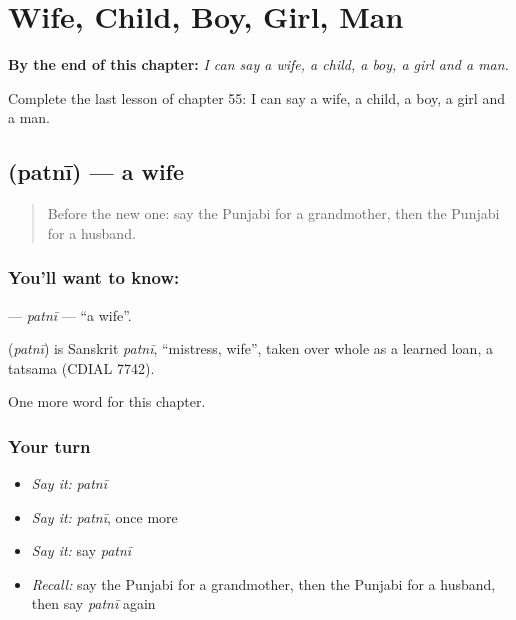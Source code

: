 
\chapter{Wife, Child, Boy, Girl, Man}
\label{ch:pa-wife-child-boy-girl-man}

\begin{chapteropening}
\textbf{By the end of this chapter:} \emph{I can say a wife, a child, a boy, a girl and a man.}

Complete the last lesson of chapter 55: I can say a wife, a child, a boy, a girl and a man.
\end{chapteropening}

\section[\texorpdfstring{\pa{ਪਤਨੀ} (patnī)}{ਪਤਨੀ (patnī)}]{ (patnī) — a wife}

\label{lesson:PA-C55-patni}



\begin{quote}
Before the new one: say the Punjabi for a grandmother, then the Punjabi for a husband.
\end{quote}

\subsection*{You'll want to know: }
\textbf{} — \emph{patnī} — \textquotedblleft{}a wife\textquotedblright{}.

\begin{cousinweb}
\textbf{} (\emph{patnī}) is Sanskrit \emph{patnī}, \textquotedblleft{}mistress, wife\textquotedblright{}, taken over whole as a learned loan, a tatsama (CDIAL 7742).
\end{cousinweb}

\begin{grammarlens}[title={What you've built}]
One more word for this chapter.
\end{grammarlens}

\subsection*{Your turn}
\begin{itemize}
\raggedright
  \item \emph{Say it:} \emph{patnī}
  \item \emph{Say it:} \emph{patnī}, once more
  \item \emph{Say it:} say \emph{patnī}
  \item \emph{Recall:} say the Punjabi for a grandmother, then the Punjabi for a husband, then say \emph{patnī} again
\end{itemize}

